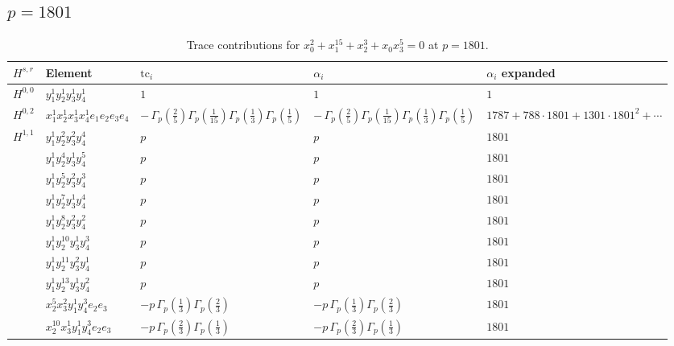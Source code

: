 \documentclass[11pt]{article}
\begin{document}
\subsection*{$p = 1801$}

\begin{table}[ht]
\centering
\caption{Trace contributions for $x_0^{2} + x_1^{15} + x_2^{3} + x_0 x_3^{5} = 0$ at $p=1801$.}\label{tab:deformed-73}
\renewcommand{\arraystretch}{1.1}
{\scriptsize
\begin{tabular}{@{}lllll@{}}
\toprule
$H^{s,r}$ & Element & $\mathrm{tc}_i$ & $\alpha_i$ & $\alpha_i$ expanded \\
\midrule
$H^{0,0}$ & $y_{1}^{1} y_{2}^{1} y_{3}^{1} y_{4}^{1}$ & $1$ & $1$ & $1$ \\
\midrule
$H^{0,2}$ & $x_{1}^{1} x_{2}^{1} x_{3}^{1} x_{4}^{1}  e_{1} e_{2} e_{3} e_{4}$ & $- \, \Gamma_p \left( \frac{2}{5} \right) \Gamma_p \left( \frac{1}{15} \right) \Gamma_p \left( \frac{1}{3} \right) \Gamma_p \left( \frac{1}{5} \right)$ & $- \, \Gamma_p \left( \frac{2}{5} \right) \Gamma_p \left( \frac{1}{15} \right) \Gamma_p \left( \frac{1}{3} \right) \Gamma_p \left( \frac{1}{5} \right)$ & $1787{+}788{\cdot}1801{+}1301{\cdot}1801^{2}{+}\cdots$ \\
\midrule
$H^{1,1}$ & $y_{1}^{1} y_{2}^{2} y_{3}^{2} y_{4}^{4}$ & $p \,$ & $p \,$ & $1801$ \\
 & $y_{1}^{1} y_{2}^{4} y_{3}^{1} y_{4}^{5}$ & $p \,$ & $p \,$ & $1801$ \\
 & $y_{1}^{1} y_{2}^{5} y_{3}^{2} y_{4}^{3}$ & $p \,$ & $p \,$ & $1801$ \\
 & $y_{1}^{1} y_{2}^{7} y_{3}^{1} y_{4}^{4}$ & $p \,$ & $p \,$ & $1801$ \\
 & $y_{1}^{1} y_{2}^{8} y_{3}^{2} y_{4}^{2}$ & $p \,$ & $p \,$ & $1801$ \\
 & $y_{1}^{1} y_{2}^{10} y_{3}^{1} y_{4}^{3}$ & $p \,$ & $p \,$ & $1801$ \\
 & $y_{1}^{1} y_{2}^{11} y_{3}^{2} y_{4}^{1}$ & $p \,$ & $p \,$ & $1801$ \\
 & $y_{1}^{1} y_{2}^{13} y_{3}^{1} y_{4}^{2}$ & $p \,$ & $p \,$ & $1801$ \\
 & $x_{2}^{5} x_{3}^{2} y_{1}^{1} y_{4}^{3} e_{2} e_{3}$ & $- p \, \Gamma_p \left( \frac{1}{3} \right) \Gamma_p \left( \frac{2}{3} \right)$ & $- p \, \Gamma_p \left( \frac{1}{3} \right) \Gamma_p \left( \frac{2}{3} \right)$ & $1801$ \\
 & $x_{2}^{10} x_{3}^{1} y_{1}^{1} y_{4}^{3} e_{2} e_{3}$ & $- p \, \Gamma_p \left( \frac{2}{3} \right) \Gamma_p \left( \frac{1}{3} \right)$ & $- p \, \Gamma_p \left( \frac{2}{3} \right) \Gamma_p \left( \frac{1}{3} \right)$ & $1801$ \\

\end{tabular}}
\end{table}
\end{document}
